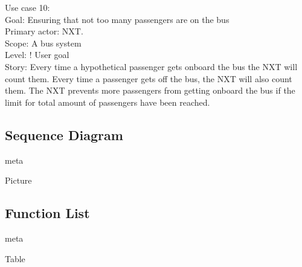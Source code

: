 Use case 10:\\
Goal: Ensuring that not too many passengers are on the bus\\
Primary actor: NXT.\\
Scope: A bus system\\
Level: ! User goal\\
Story: Every time a hypothetical passenger gets onboard the bus the NXT will count them. Every time a passenger gets off the bus, the NXT will also count them. The NXT prevents more passengers from getting onboard the bus if the limit for total amount of passengers have been reached.

\subsection{Sequence Diagram}
meta

Picture

\subsection{Function List}
meta

Table